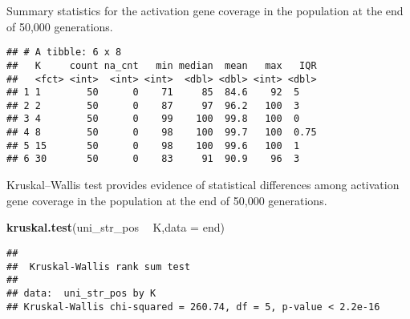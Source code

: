 \documentclass[]{book}
\newenvironment{Shaded}{\begin{snugshade}}{\end{snugshade}}
\newcommand{\DataTypeTok}[1]{\textcolor[rgb]{0.13,0.29,0.53}{#1}}
\newcommand{\KeywordTok}[1]{\textcolor[rgb]{0.13,0.29,0.53}{\textbf{#1}}}
\newcommand{\NormalTok}[1]{#1}
\newcommand{\OperatorTok}[1]{\textcolor[rgb]{0.81,0.36,0.00}{\textbf{#1}}}
\newcommand{\OtherTok}[1]{\textcolor[rgb]{0.56,0.35,0.01}{#1}}
\newcommand{\StringTok}[1]{\textcolor[rgb]{0.31,0.60,0.02}{#1}}
\begin{document}
Summary statistics for the activation gene coverage in the population at the end of 50,000 generations.

\begin{Shaded}
\end{Shaded}

\begin{verbatim}
## # A tibble: 6 x 8
##   K     count na_cnt   min median  mean   max   IQR
##   <fct> <int>  <int> <int>  <dbl> <dbl> <int> <dbl>
## 1 1        50      0    71     85  84.6    92  5   
## 2 2        50      0    87     97  96.2   100  3   
## 3 4        50      0    99    100  99.8   100  0   
## 4 8        50      0    98    100  99.7   100  0.75
## 5 15       50      0    98    100  99.6   100  1   
## 6 30       50      0    83     91  90.9    96  3
\end{verbatim}

Kruskal--Wallis test provides evidence of statistical differences among activation gene coverage in the population at the end of 50,000 generations.

\begin{Shaded}
\begin{Highlighting}[]
\KeywordTok{kruskal.test}\NormalTok{(uni_str_pos }\OperatorTok{~}\StringTok{ }\NormalTok{K,}\DataTypeTok{data =}\NormalTok{ end)}
\end{Highlighting}
\end{Shaded}

\begin{verbatim}
## 
##  Kruskal-Wallis rank sum test
## 
## data:  uni_str_pos by K
## Kruskal-Wallis chi-squared = 260.74, df = 5, p-value < 2.2e-16
\end{verbatim}
\end{document}
